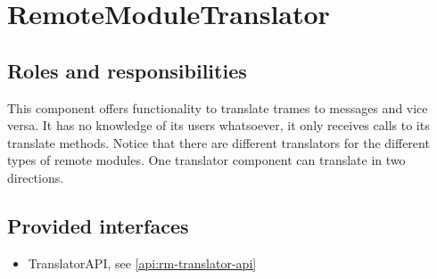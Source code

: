 \section{RemoteModuleTranslator}
\label{element:rm-translator}

\subsection{Roles and responsibilities}

\npar This component offers functionality to translate trames to messages and
vice versa. It has no knowledge of its users whatsoever, it only receives calls
to its translate methods. Notice that there are different translators for the
different types of remote modules. One translator component can translate in two
directions.

\subsection{Provided interfaces}

\begin{itemize}
  \item TranslatorAPI, see \ref{api:rm-translator-api}
\end{itemize}
